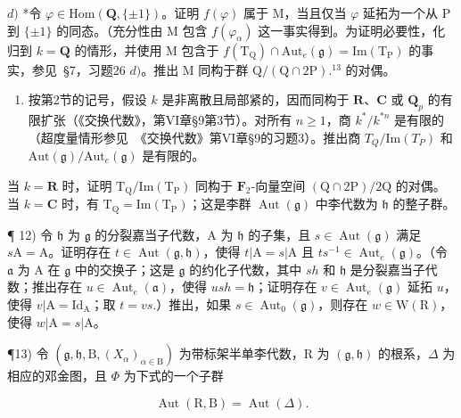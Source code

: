 \(d)\) *令 \(\varphi\in\mathrm{Hom}(\mathbf{Q},\{\pm1\})\)。证明 \(f(\varphi)\) 属于 M，当且仅当 \(\varphi\) 延拓为一个从 P 到 \(\{\pm1\}\) 的同态。（充分性由 M 包含 \(f(\varphi_{\alpha})\) 这一事实得到。为证明必要性，化归到 \(k=\mathbf{Q}\) 的情形，并使用 M 包含于 \(f(\mathrm{T}_{\mathrm{Q}})\cap\mathrm{Aut}_{e}(\mathfrak{g})=\mathrm{Im}(\mathrm{T}_{\mathrm{P}})\) 的事实，参见~§7，习题26 \(d)\)。推出 M 同构于群 \(\mathrm{Q}/(\mathrm{Q}\cap2\mathrm{P}).^{13}\) 的对偶。

\begin{enumerate}
\def\labelenumi{\arabic{enumi})}
\setcounter{enumi}{10}
\tightlist
\item
  按第2节的记号，假设 \(k\) 是非离散且局部紧的，因而同构于 \(\mathbf{R}\)、\(\mathbf{C}\) 或 \(\mathbf{Q}_p\) 的有限扩张（《交换代数》，第VI章§9第3节）。对所有 \(n \geq 1\)，商 \(k^* / k^{*n}\) 是有限的（超度量情形参见~《交换代数》第VI章§9的习题3）。推出商 \(T_Q / \text{Im}(T_P)\) 和 \(\text{Aut}(\mathfrak{g}) / \text{Aut}_e(\mathfrak{g})\) 是有限的。
\end{enumerate}

当 \(k = \mathbf{R}\) 时，证明 \(\mathrm{T_Q / Im(T_P)}\) 同构于 \(\mathbf{F}_{2}\)-向量空间 \((\mathrm{Q} \cap 2\mathrm{P}) / 2\mathrm{Q}\) 的对偶。当 \(k = \mathbf{C}\) 时，有 \(\mathrm{T_Q = Im(T_P)}\)；这是李群 \(\operatorname{Aut}(\mathfrak{g})\) 中李代数为 \(\mathfrak{h}\) 的整子群。

¶ 12) 令 \(\mathfrak{h}\) 为 \(\mathfrak{g}\) 的分裂嘉当子代数，A 为 \(\mathfrak{h}\) 的子集，且 \(s \in \operatorname{Aut}(\mathfrak{g})\) 满足 \(s\mathrm{A} = \mathrm{A}\)。证明存在 \(t \in \operatorname{Aut}(\mathfrak{g}, \mathfrak{h})\)，使得 \(t|\mathrm{A} = s|\mathrm{A}\) 且 \(ts^{-1} \in \operatorname{Aut}_e(\mathfrak{g})\)。（令 \(\mathfrak{a}\) 为 A 在 \(\mathfrak{g}\) 中的交换子；这是 \(\mathfrak{g}\) 的约化子代数，其中 \(sh\) 和 \(\mathfrak{h}\) 是分裂嘉当子代数；推出存在 \(u \in \operatorname{Aut}_e(\mathfrak{a})\)，使得 \(ush = \mathfrak{h}\)；证明存在 \(v \in \operatorname{Aut}_e(\mathfrak{g})\) 延拓 \(u\)，使得 \(v|\mathrm{A} = \mathrm{Id}_{\mathrm{A}}\)；取 \(t = vs.\)）推出，如果 \(s \in \operatorname{Aut}_0(\mathfrak{g})\)，则存在 \(w \in \mathrm{W}(\mathrm{R})\)，使得 \(w|\mathrm{A} = s|\mathrm{A}\)。

¶13) 令 \((\mathfrak{g},\mathfrak{h},\mathrm{B},(X_{\alpha})_{\alpha\in\mathrm{B}})\) 为带标架半单李代数，R 为 \((\mathfrak{g},\mathfrak{h})\) 的根系，\(\Delta\) 为相应的邓金图，且 \(\varPhi\) 为下式的一个子群

\[
\operatorname{Aut} (\mathrm{R}, \mathrm{B}) = \operatorname{Aut} (\Delta).
\]


